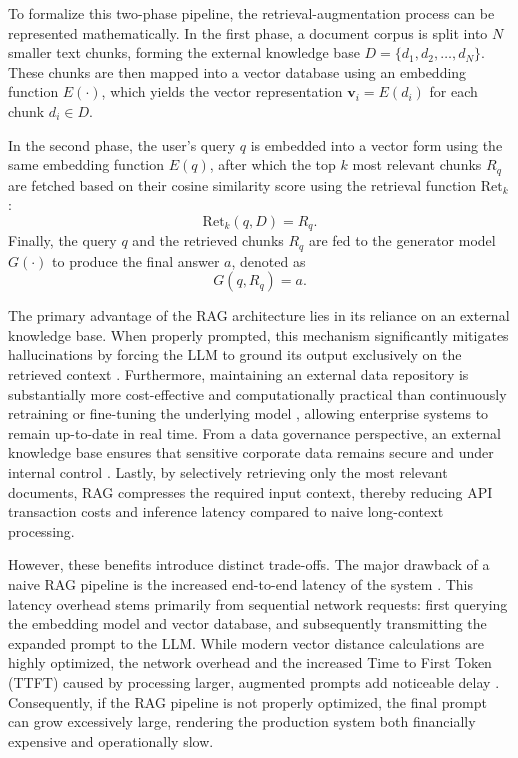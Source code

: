 To formalize this two-phase pipeline, the retrieval-augmentation process can be represented mathematically. In the first phase, a document corpus is split into $N$ smaller text chunks, forming the external knowledge base $D = \{d_1, d_2, \ldots, d_N\}$. These chunks are then mapped into a vector database using an embedding function $E(\cdot)$, which yields the vector representation $\mathbf{v}_i = E(d_i)$ for each chunk $d_i \in D$.

In the second phase, the user's query $q$ is embedded into a vector form using the same embedding function $E(q)$, after which the top $k$ most relevant chunks $R_q$ are fetched based on their cosine similarity score using the retrieval function $\text{Ret}_k$:
\begin{equation}
    \text{Ret}_k(q, D) = R_q.
\end{equation}
Finally, the query $q$ and the retrieved chunks $R_q$ are fed to the generator model $G(\cdot)$ to produce the final answer $a$, denoted as
\begin{equation}
    G(q, R_q) = a.
\end{equation}

The primary advantage of the RAG architecture lies in its reliance on an external knowledge base. When properly prompted, this mechanism significantly mitigates hallucinations by forcing the LLM to ground its output exclusively on the retrieved context \citep{shuster2021retrieval}. Furthermore, maintaining an external data repository is substantially more cost-effective and computationally practical than continuously retraining or fine-tuning the underlying model \citep{gao2023retrieval}, allowing enterprise systems to remain up-to-date in real time. From a data governance perspective, an external knowledge base ensures that sensitive corporate data remains secure and under internal control \citep{ni2026towards}. Lastly, by selectively retrieving only the most relevant documents, RAG compresses the required input context, thereby reducing API transaction costs and inference latency compared to naive long-context processing.

However, these benefits introduce distinct trade-offs. The major drawback of a naive RAG pipeline is the increased end-to-end latency of the system \citep{gao2023retrieval}. This latency overhead stems primarily from sequential network requests: first querying the embedding model and vector database, and subsequently transmitting the expanded prompt to the LLM. While modern vector distance calculations are highly optimized, the network overhead and the increased Time to First Token (TTFT) caused by processing larger, augmented prompts add noticeable delay \citep{gao2023retrieval}. Consequently, if the RAG pipeline is not properly optimized, the final prompt can grow excessively large, rendering the production system both financially expensive and operationally slow.

